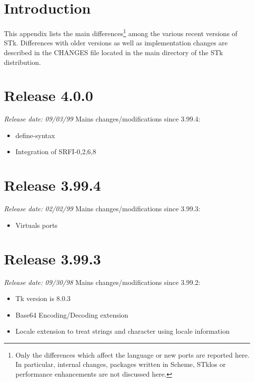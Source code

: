 %
%
%

\section*{Introduction}

This appendix lists the main differences\footnote{ Only the
  differences which affect the language or new ports are reported
  here.  In particular, internal changes, packages written in Scheme,
  STklos or performance enhancements are not discussed here.} among
the various recent versions of STk.  Differences with older versions
as well as implementation changes are described in the CHANGES file
located in the main directory of the STk distribution.

\section*{Release 4.0.0}
\small{\emph{Release date: 09/03/99}}
Mains changes/modifications since 3.99.4:
\begin{itemize}
\item define-syntax
\item Integration of SRFI-{0,2,6,8}
\end{itemize}

\section*{Release 3.99.4}
\small{\emph{Release date: 02/02/99}}
Mains changes/modifications since 3.99.3:
\begin{itemize}
\item  Virtuals ports
\end{itemize}

\section*{Release 3.99.3}
\small{\emph{Release date: 09/30/98}}
Mains changes/modifications since 3.99.2:
\begin{itemize}
\item  Tk version is 8.0.3
  
\item Base64 Encoding/Decoding extension
  
\item Locale extension to treat strings and character using locale
  information
\end{itemize}

